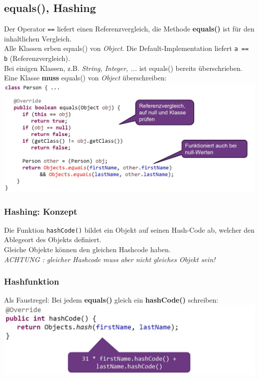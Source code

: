 \subsection{equals(), Hashing}
Der Operator \verb|==| liefert einen Referenzvergleich, die Methode \textbf{equals()} ist für den inhaltlichen Vergleich.\\
Alle Klassen erben equals() von \textit{Object}. Die Default-Implementation liefert \verb|a == b| (Referenzvergleich). \\
Bei einigen
Klassen, z.B. \textit{String, Integer, ...} ist equals() bereits überschrieben.\\
Eine Klasse \textbf{muss} equals() von \textit{Object} überschreiben:\\
\includegraphics[width=\linewidth]{pictures/equals-impl.jpg}

\subsubsection{Hashing: Konzept}
Die Funktion \verb|hashCode()| bildet ein Objekt auf seinen Hash-Code ab, welcher den Ablegeort des Objekts definiert.\\
Gleiche Objekte können den gleichen Hashcode haben.\\
\textit{ACHTUNG : gleicher Hashcode muss aber nicht gleiches Objekt sein!}

\subsubsection{Hashfunktion}
Als Faustregel: Bei jedem \textbf{equals()} gleich ein \textbf{hashCode()} schreiben:\\
\includegraphics[width=\linewidth]{pictures/hashcode.jpg}


